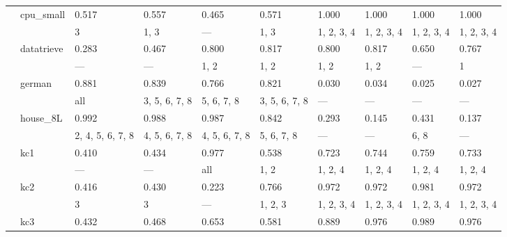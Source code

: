 \documentclass{article}
\begin{document}
\begin{center}
\begin{longtable}{p{1.2cm}p{1.8cm}p{1cm}p{1cm}p{1cm}p{1cm}p{1cm}p{1cm}p{1cm}p{1cm}}
             & cpu\_small    & 0.517            & 0.557            & 0.465            & 0.571            & 1.000      & 1.000         & 1.000         & 1.000         \\
             &              & 3                & 1, 3             & ---              & 1, 3             & 1, 2, 3, 4 & 1, 2, 3, 4    & 1, 2, 3, 4    & 1, 2, 3, 4    \\
             & datatrieve   & 0.283            & 0.467            & 0.800            & 0.817            & 0.800      & 0.817         & 0.650         & 0.767         \\
             &              & ---              & ---              & 1, 2             & 1, 2             & 1, 2       & 1, 2          & ---           & 1             \\
             & german       & 0.881            & 0.839            & 0.766            & 0.821            & 0.030      & 0.034         & 0.025         & 0.027         \\
             &              & all              & 3, 5, 6, 7, 8    & 5, 6, 7, 8       & 3, 5, 6, 7, 8    & ---        & ---           & ---           & ---           \\
             & house\_8L     & 0.992            & 0.988            & 0.987            & 0.842            & 0.293      & 0.145         & 0.431         & 0.137         \\
             &              & 2, 4, 5, 6, 7, 8 & 4, 5, 6, 7, 8    & 4, 5, 6, 7, 8    & 5, 6, 7, 8       & ---        & ---           & 6, 8          & ---           \\
             & kc1          & 0.410            & 0.434            & 0.977            & 0.538            & 0.723      & 0.744         & 0.759         & 0.733         \\
             &              & ---              & ---              & all              & 1, 2             & 1, 2, 4    & 1, 2, 4       & 1, 2, 4       & 1, 2, 4       \\
             & kc2          & 0.416            & 0.430            & 0.223            & 0.766            & 0.972      & 0.972         & 0.981         & 0.972         \\
             &              & 3                & 3                & ---              & 1, 2, 3          & 1, 2, 3, 4 & 1, 2, 3, 4    & 1, 2, 3, 4    & 1, 2, 3, 4    \\
             & kc3          & 0.432            & 0.468            & 0.653            & 0.581            & 0.889      & 0.976         & 0.989         & 0.976         \\

\end{longtable}
\end{center}
\end{document}
